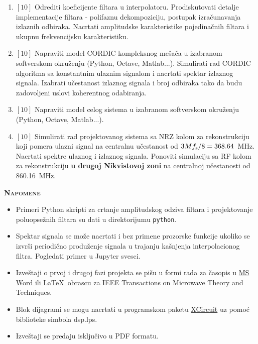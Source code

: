 \documentclass[a4paper]{article}
\begin{document}
\begin{enumerate}
\item $[10]$ Odrediti koeficijente filtara u interpolatoru. Prodiskutovati detalje implementacije filtara - polifaznu dekompoziciju, postupak izračunavanja izlaznih odbiraka. Nacrtati amplitudske karakteristike pojedinačnih filtara i ukupnu frekvencijsku karakteristiku.
\item $[10]$ Napraviti model CORDIC kompleksnog mešača u izabranom softverskom okruženju (Python, Octave, Matlab...). Simulirati rad CORDIC algoritma sa konstantnim ulaznim signalom i nacrtati spektar izlaznog signala. Izabrati učestanost izlaznog signala i broj odbiraka tako da budu zadovoljeni uslovi koherentnog odabiranja.
\item $[10]$ Napraviti model celog sistema u izabranom softverskom okruženju (Python, Octave, Matlab...).
\item $[10]$ Simulirati rad projektovanog sistema sa NRZ kolom za rekonstrukciju koji pomera ulazni signal na centralnu učestanost od $3M f_{\mathrm{s}}/8=368.64$~MHz. Nacrtati spektre ulaznog i izlaznog signala. Ponoviti simulaciju sa RF kolom za rekonstrukciju \textbf{u drugoj Nikvistovoj zoni} na centralnoj učestanosti od 860.16~MHz.
\end{enumerate}

\begin{center}
\large{\textbf{\textsc{Napomene}}}
\end{center}

\begin{itemize}

	\item Primeri Python skripti za crtanje amplitudskog odziva filtara i projektovanje poluopsežnih  filtara su dati u direktorijumu \texttt{python}.

	\item Spektar signala se može nacrtati i bez primene prozorske funkcije ukoliko se izvrši periodično produženje signala u trajanju kašnjenja interpolacionog filtra. Pogledati primer u Jupyter svesci.

	\item Izveštaji o prvoj i drugoj fazi projekta se pišu u formi rada za časopis u 
\href{https://journals.ieeeauthorcenter.ieee.org/create-your-ieee-journal-article/authoring-tools-and-templates/ieee-article-templates/templates-for-transactions}{MS Word ili \LaTeX~obrascu}
za IEEE Transactions on Microwave Theory and Techniques.

	\item Blok dijagrami se mogu nacrtati u programskom paketu 
		\href{http://opencircuitdesign.com/xcircuit/}{XCircuit}  uz pomoć 
		biblioteke simbola dsp.lps.

	\item Izveštaji se predaju isključivo u PDF formatu.
\end{itemize}
\end{document}
